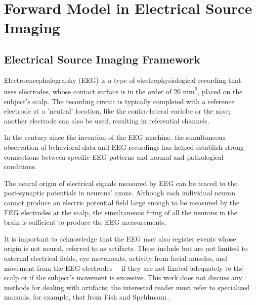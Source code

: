 \chapter{Forward Model in Electrical Source Imaging}
\label{ch:forward}

\section{Electrical Source Imaging Framework}




Electroencephalography (EEG) is a type of electrophysiological recording that uses electrodes, whose contact surface is in the order of 20 \si{mm^2}, placed on the subject's scalp.
%
The recording circuit is typically completed with a reference electrode at a 'neutral' location, like the contra-lateral earlobe or the nose; another electrode can also be used, resulting in referential channels. 
%

In the century since the invention of the EEG machine, the simultaneous observation of behavioral data and EEG recordings has helped establish strong connections between specific EEG patterns and normal and pathological conditions.

The neural origin of electrical signals measured by EEG can be traced to the post-synaptic potentials in neurons' axons.
%
Although each individual neuron cannot produce an electric potential field large enough to be measured by the EEG electrodes at the scalp, the simultaneous firing of all the neurons in the brain is sufficient to produce the EEG measurements.

It is important to acknowledge that the EEG may also register events whose origin is not neural, referred to as artifacts. These include but are not limited to external electrical fields, eye movements, activity from facial muscles, and movement from the EEG electrodes —if they are not fixated adequately to the scalp or if the subject's movement is excessive.
%
This work does not discuss any methods for dealing with artifacts; the interested reader must refer to specialized manuals, for example, that from Fish and Spehlmann \cite{fisch1999fisch}.

